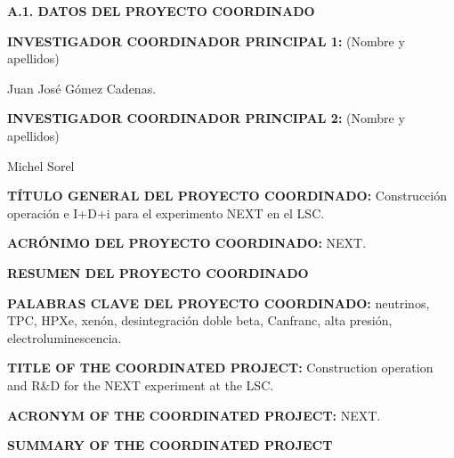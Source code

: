 \documentclass[a4paper,11pt,oneside]{article}
\begin{document}

\noindent\textbf{A.1. DATOS DEL PROYECTO COORDINADO}
\vspace{6pt}

\noindent\textbf{INVESTIGADOR COORDINADOR PRINCIPAL 1:} (Nombre y apellidos)

\noindent Juan José Gómez Cadenas.
\vspace{6pt}

\noindent\textbf{INVESTIGADOR COORDINADOR PRINCIPAL 2:} (Nombre y apellidos)

\noindent Michel Sorel
\vspace{6pt}

\noindent\textbf{TÍTULO GENERAL DEL PROYECTO COORDINADO:} Construcción operación e I+D+i para el experimento NEXT en el LSC.
\vspace{6pt}

\noindent\textbf{ACRÓNIMO DEL PROYECTO COORDINADO:} NEXT.


\noindent\textbf{RESUMEN DEL PROYECTO COORDINADO} 
{\color{blue}{M\'aximo 3500 caracteres (incluyendo espacios en blanco):}}
\vspace{12pt}


 
\vspace{12pt}

\noindent\textbf{PALABRAS CLAVE DEL PROYECTO COORDINADO:} neutrinos, TPC, HPXe, xenón, desintegración doble beta, Canfranc, alta presión, electroluminescencia. 

\vspace{12pt}

\noindent\textbf{TITLE OF THE COORDINATED PROJECT:} Construction operation and R\&D for the NEXT experiment at the LSC. 
\vspace{6pt}

\noindent\textbf{ACRONYM OF THE COORDINATED PROJECT:} NEXT.
\vspace{6pt}

\noindent\textbf{SUMMARY OF THE COORDINATED PROJECT} 
\vspace{6pt}



 \vspace{12pt}
\end{document}
